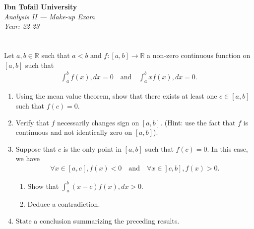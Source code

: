 \documentclass[12pt]{article}
\begin{document}
\begin{center}
  \Large\textbf{Ibn Tofail University} \\[1em]
  \large\textit{Analysis II — Make-up Exam} \\[0.5em]
  \large\textit{Year: 22-23} \\[2em]
\end{center}

\vspace{0.5cm}

\section{}
Let $a, b \in \mathbb{R}$ such that $a < b$ and $f: [a, b] \rightarrow \mathbb{R}$ a non-zero continuous function on $[a, b]$ such that
\begin{align*}
\int_a^b f(x) , dx = 0 \quad \text{and} \quad \int_a^b x f(x) , dx = 0.
\end{align*}
\begin{enumerate}
\item Using the mean value theorem, show that there exists at least one $c \in [a, b]$ such that $f(c) = 0$.
\item Verify that $f$ necessarily changes sign on $[a, b]$. (Hint: use the fact that $f$ is continuous and not identically zero on $[a, b]$).
\item Suppose that $c$ is the only point in $[a, b]$ such that $f(c) = 0$. In this case, we have
\begin{align*}
\forall x \in [a, c[, f(x) < 0 \quad \text{and} \quad \forall x \in ]c, b], f(x) > 0.
\end{align*}
\begin{enumerate}
\item Show that $\int_a^b (x-c)f(x) , dx > 0$.
\item Deduce a contradiction.
\end{enumerate}
\item State a conclusion summarizing the preceding results.
\end{enumerate}

\newpage

\begin{answerbox}


\end{answerbox}

\newpage

\end{document}
